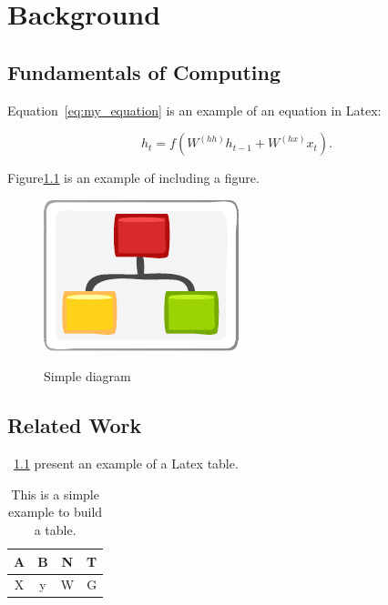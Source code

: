 
\chapter{Background}\label{chap:background}



\section{Fundamentals of Computing}\label{sec:fundamental}

Equation~\ref{eq:my_equation} is an example of an equation in Latex:

\begin{equation}\label{eq:my_equation}
    h_t = f(W^{(hh)}h_{t-1} + W^{(hx)}x_t).
\end{equation}


Figure\ref{fig:diagram} is an example of including a figure.

\begin{figure}[htb]
    \caption{Simple diagram}
    \centering
    \includegraphics[scale=1.9]{img/diagram.pdf}
    \label{fig:diagram}
\end{figure}




\section{Related Work}\label{sec:rw}


\tablename~\ref{tab:my_table} present an example of a Latex table.

\begin{table}[htb]
    \centering
    \begin{tabular}{|c|c|c|c|}
        \hline
         A & B & N & T\\ 
         \hline
         X & y & W & G\\
         \hline
    \end{tabular}
    \caption{This is a simple example to build a table.}
    \label{tab:my_table}
\end{table}